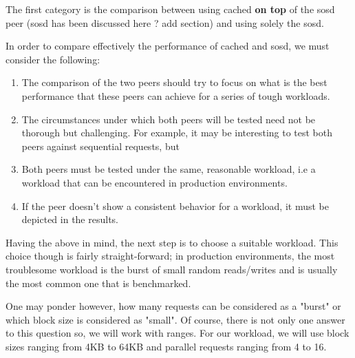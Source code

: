 The first category is the comparison between using cached \textbf{on top} of 
the sosd peer (sosd has been discussed here ? \fixme add section) and using 
solely the sosd.

\begin{comment}
The category's goal is to "defend" one of the core thesis arguments, that 
tiering is a key element that will improve the performance of Archipelago.  
\end{comment}

In order to compare effectively the performance of cached and sosd, we must 
consider the following: 

\begin{enumerate}
	\item The comparison of the two peers should try to focus on what is 
		the best performance that these peers can achieve for a series 
		of tough workloads.
	\item The circumstances under which both peers will be tested need not 
		be thorough but challenging. For example, it may be interesting 
		to test both peers against sequential requests, but
		
	\item Both peers must be tested under the same, reasonable workload, 
		i.e a workload that can be encountered in production 
		environments.
	\item If the peer doesn't show a consistent behavior for a workload, it 
		must be depicted in the results.
\end{enumerate}

Having the above in mind, the next step is to choose a suitable workload.  This 
choice though is fairly straight-forward; in production environments, the most 
troublesome workload is the burst of small random reads/writes and is usually 
the most common one that is benchmarked.  

One may ponder however, how many requests can be considered as a "burst" or 
which block size is considered as "small". Of course, there is not only one 
answer to this question so, we will work with ranges. For our workload, we will 
use block sizes ranging from 4KB to 64KB and parallel requests ranging from 4 
to 16.

